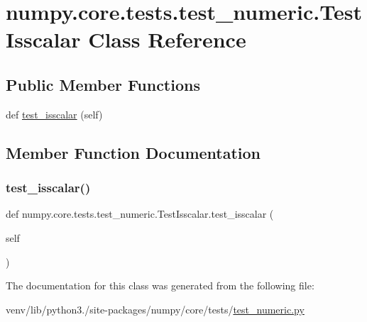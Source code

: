 \hypertarget{classnumpy_1_1core_1_1tests_1_1test__numeric_1_1TestIsscalar}{}\section{numpy.\+core.\+tests.\+test\+\_\+numeric.\+Test\+Isscalar Class Reference}
\label{classnumpy_1_1core_1_1tests_1_1test__numeric_1_1TestIsscalar}
\subsection*{Public Member Functions}
\begin{DoxyCompactItemize}
\item 
def \hyperlink{classnumpy_1_1core_1_1tests_1_1test__numeric_1_1TestIsscalar_a3eb178f35db6307cdb5169fc5feaddc1}{test\+\_\+isscalar} (self)
\end{DoxyCompactItemize}


\subsection{Member Function Documentation}
\mbox{\label{classnumpy_1_1core_1_1tests_1_1test__numeric_1_1TestIsscalar_a3eb178f35db6307cdb5169fc5feaddc1}} 
\subsubsection{\texorpdfstring{test\+\_\+isscalar()}{test\_isscalar()}}
{\footnotesize\ttfamily def numpy.\+core.\+tests.\+test\+\_\+numeric.\+Test\+Isscalar.\+test\+\_\+isscalar (\begin{DoxyParamCaption}\item[{}]{self }\end{DoxyParamCaption})}



The documentation for this class was generated from the following file\+:\begin{DoxyCompactItemize}
\item 
venv/lib/python3./site-\/packages/numpy/core/tests/\hyperlink{core_2tests_2test__numeric_8py}{test\+\_\+numeric.\+py}\end{DoxyCompactItemize}
